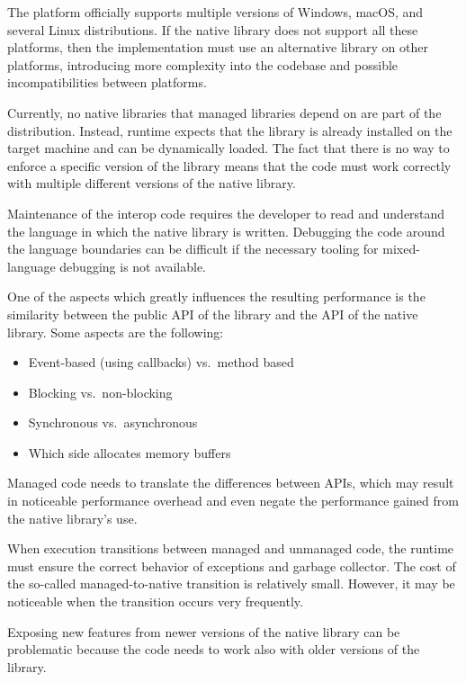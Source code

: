 \begin{itemize}

     The \dotnet{} platform officially supports
    multiple versions of Windows, macOS, and several Linux distributions. If the native library does
    not support all these platforms, then the implementation must use an alternative library on
    other platforms, introducing more complexity into the codebase and possible incompatibilities
    between platforms.

     Currently, no native libraries that managed
    \dotnet{} libraries depend on are part of the \dotnet{} distribution. Instead, \dotnet{} runtime
    expects that the library is already installed on the target machine and can be dynamically
    loaded. The fact that there is no way to enforce a specific version of the library means that
    the \dotnet{} code must work correctly with multiple different versions of the native library.

     Maintenance of the interop code requires the developer to read and
    understand the language in which the native library is written. Debugging the code around the
    language boundaries can be difficult if the necessary tooling for mixed-language debugging is
    not available.

     One of the aspects which greatly influences the resulting performance is
    the similarity between the public API of the \dotnet{} library and the API of the native
    library. Some aspects are the following:

    \begin{itemize}
      \item Event-based (using callbacks) vs.\ method based
      \item Blocking vs.\ non-blocking
      \item Synchronous vs.\ asynchronous
      \item Which side allocates memory buffers
    \end{itemize}

    Managed code needs to translate the differences between APIs, which may result in noticeable
    performance overhead and even negate the performance gained from the native library's use.

     When execution transitions between managed and unmanaged code,
    the runtime must ensure the correct behavior of exceptions and garbage collector. The cost of
    the so-called managed-to-native transition is relatively small. However, it may be noticeable
    when the transition occurs very frequently.

     Exposing new features from newer versions of the native library can
    be problematic because the code needs to work also with older versions of the library.

\end{itemize}

